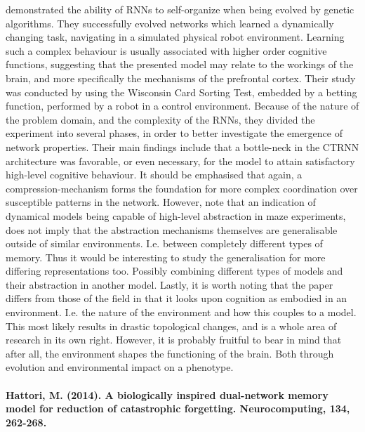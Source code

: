 \cite{Maniadakis2012} demonstrated the ability of RNNs to self-organize when being evolved by genetic algorithms. They successfully evolved networks which learned a dynamically changing task, navigating in a simulated physical robot environment. Learning such a complex behaviour is usually associated with higher order cognitive functions, suggesting that the presented model may relate to the workings of the brain, and more specifically the mechanisms of the prefrontal cortex.
Their study was conducted by using the Wisconsin Card Sorting Test, embedded by a betting function, performed by a robot in a control environment. Because of the nature of the problem domain, and the complexity of the RNNs, they divided the experiment into several phases, in order to better investigate the emergence of network properties. Their main findings include that a bottle-neck in the CTRNN architecture was favorable, or even necessary, for the model to attain satisfactory high-level cognitive behaviour. It should be emphasised that again, a compression-mechanism forms the foundation for more complex coordination over susceptible patterns in the network. However, note that an indication of dynamical models being capable of high-level abstraction in maze experiments, does not imply that the abstraction mechanisms  themselves are generalisable outside of similar environments. I.e. between completely different types of memory. Thus it would be interesting to study the generalisation for more differing representations too. Possibly combining different types of models and their abstraction in another model. Lastly, it is worth noting that the paper differs from those of the field in that it looks upon cognition as embodied in an environment. I.e. the nature of the environment and how this couples to a model. This most likely results in drastic topological changes, and is a whole area of research in its own right. However, it is probably fruitful to bear in mind that after all, the environment shapes the functioning of the brain. Both through evolution and environmental impact on a phenotype.
\\
\\
\textbf{Hattori, M. (2014). A biologically inspired dual-network memory model for reduction of catastrophic forgetting. Neurocomputing, 134, 262-268.}

